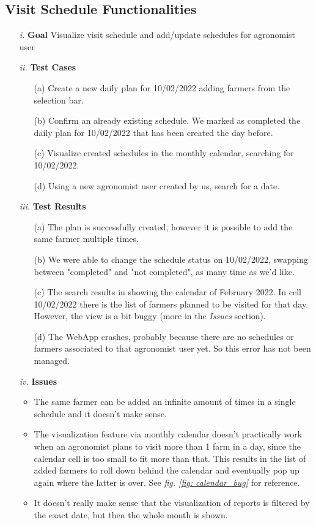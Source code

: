 \documentclass[table, 12pt]{article}
\begin{document}
\subsection{Visit Schedule Functionalities}
\begin{itemize}
    \item[\textit{i.}] \textbf{Goal} Visualize visit schedule and add/update schedules for agronomist user
    \item[\textit{ii.}] \textbf{Test Cases}
    \begin{itemize}
        \item[(a)] Create a new daily plan for 10/02/2022 adding farmers from the selection bar.
        \item[(b)] Confirm an already existing schedule. We marked as completed the daily plan for 10/02/2022 that has been created the day before.
        \item[(c)] Visualize created schedules in the monthly calendar, searching for 10/02/2022.
        \item[(d)] Using a new agronomist user created by us, search for a date.
    \end{itemize} 
    \item[\textit{iii.}] \textbf{Test Results}
    \begin{itemize}
        \item[(a)] The plan is successfully created, however it is possible to add the same farmer multiple times.
        \item[(b)] We were able to change the schedule status on 10/02/2022, swapping between "completed" and "not completed", as many time as we'd like.
        \item[(c)] The search results in showing the calendar of February 2022. In cell 10/02/2022 there is the list of farmers planned to be visited for that day. However, the view is a bit buggy (more in the \emph{Issues} section).
        \item[(d)] The WebApp crashes, probably because there are no schedules or farmers associated to that agronomist user yet. So this error has not been managed.
    \end{itemize} 
    \item[\textit{iv.}] \textbf{Issues}
    \begin{itemize}
        \item The same farmer can be added an infinite amount of times in a single schedule and it doesn't make sense.
        \item The visualization feature via monthly calendar doesn't practically work when an agronomist plans to visit more than 1 farm in a day, since the calendar cell is too small to fit more than that. This results in the list of added farmers to roll down behind the calendar and eventually pop up again where the latter is over. See \emph{fig. \ref{fig: calendar_bug}} for reference.
        \item It doesn't really make sense that the visualization of reports is filtered by the exact date, but then the whole month is shown. 
    \end{itemize} 
\end{itemize}
\end{document}
